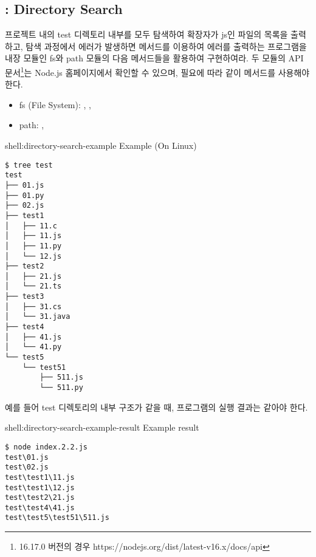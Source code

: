 \subsection*{: Directory Search}

프로젝트 내의 test 디렉토리 내부를 모두 탐색하여 확장자가 js인 파일의 목록을 출력하고, 탐색 과정에서 에러가 발생하면  메서드를 이용하여 에러를 출력하는 프로그램을 내장 모듈인 fs와 path 모듈의 다음 메서드들을 활용하여 구현하여라. 두 모듈의 API 문서\footnote{16.17.0 버전의 경우 https://nodejs.org/dist/latest-v16.x/docs/api}는 Node.js 홈페이지에서 확인할 수 있으며, 필요에 따라 \과 같이  메서드를 사용해야 한다.

\begin{itemize}
    \item fs (File System): , , 
    \item path: , 
\end{itemize}

\begin{shell}{shell:directory-search-example}{ Example (On Linux)}
\begin{verbatim}
$ tree test
test
├── 01.js
├── 01.py
├── 02.js
├── test1
│   ├── 11.c
│   ├── 11.js
│   ├── 11.py
│   └── 12.js
├── test2
│   ├── 21.js
│   └── 21.ts
├── test3
│   ├── 31.cs
│   └── 31.java
├── test4
│   ├── 41.js
│   └── 41.py
└── test5
    └── test51
        ├── 511.js
        └── 511.py
\end{verbatim}
\end{shell}

예를 들어 test 디렉토리의 내부 구조가 \과 같을 때, 프로그램의 실행 결과는 \와 같아야 한다.

\begin{shell}{shell:directory-search-example-result}{ Example result}
\begin{verbatim}
$ node index.2.2.js
test\01.js
test\02.js
test\test1\11.js
test\test1\12.js
test\test2\21.js
test\test4\41.js
test\test5\test51\511.js
\end{verbatim}
\end{shell}
